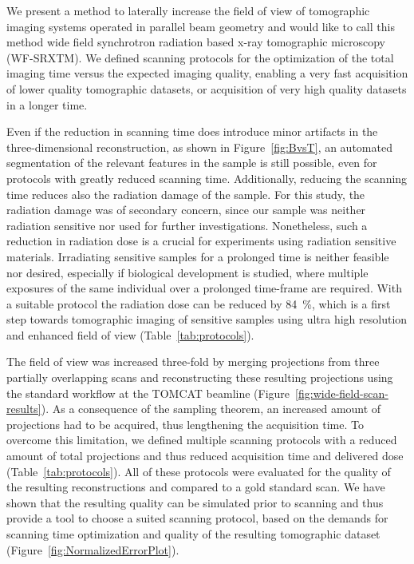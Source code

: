 \documentclass[preprint,s]{iucr}
\begin{document}
We present a method to laterally increase the field of view of tomographic imaging systems operated in parallel beam geometry and would like to call this method wide field synchrotron radiation based x-ray tomographic microscopy (WF-SRXTM). We defined scanning protocols for the optimization of the total imaging time versus the expected imaging quality, enabling a very fast acquisition of lower quality tomographic datasets, or acquisition of very high quality datasets in a longer time.

Even if the reduction in scanning time does introduce minor artifacts in the three-dimensional reconstruction, as shown in Figure~\ref{fig:BvsT}, an automated segmentation of the relevant features in the sample is still possible, even for protocols with greatly reduced scanning time. Additionally, reducing the scanning time reduces also the radiation damage of the sample. For this study, the radiation damage was of secondary concern, since our sample was neither radiation sensitive nor used for further investigations. Nonetheless, such a reduction in radiation dose is a crucial for experiments using radiation sensitive materials. Irradiating sensitive samples for a prolonged time is neither feasible nor desired, especially if biological development is studied, where multiple exposures of the same individual over a prolonged time-frame are required. With a suitable protocol the radiation dose can be reduced by \SI{84}{\percent}, which is a first step towards tomographic imaging of sensitive samples using ultra high resolution and enhanced field of view (Table~\ref{tab:protocols}).

The field of view was increased three-fold by merging projections from three partially overlapping scans and reconstructing these resulting projections using the standard workflow at the TOMCAT beamline (Figure~\ref{fig:wide-field-scan-results}). As a consequence of the sampling theorem, an increased amount of projections had to be acquired, thus lengthening the acquisition time. To overcome this limitation, we defined multiple scanning protocols with a reduced amount of total projections and thus reduced acquisition time and delivered dose (Table~\ref{tab:protocols}). All of these protocols were evaluated for the quality of the resulting reconstructions and compared to a gold standard scan. We have shown that the resulting quality can be simulated prior to scanning and thus provide a tool to choose a suited scanning protocol, based on the demands for scanning time optimization and quality of the resulting tomographic dataset (Figure~\ref{fig:NormalizedErrorPlot}). 
\end{document}
